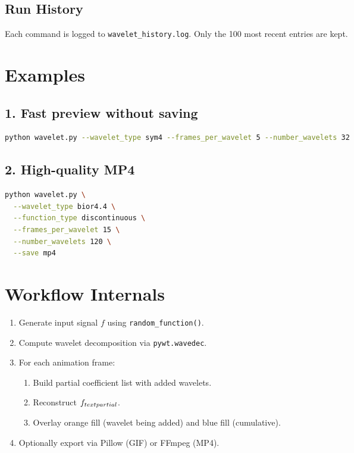 \documentclass[12pt]{article}
\begin{document}
\subsection*{Run History}
Each command is logged to \texttt{wavelet\_history.log}. Only the 100 most recent entries are kept.

\section{Examples}
\subsection*{1. Fast preview without saving}
\begin{lstlisting}[language=bash]
python wavelet.py --wavelet_type sym4 --frames_per_wavelet 5 --number_wavelets 32
\end{lstlisting}

\subsection*{2. High-quality MP4}
\begin{lstlisting}[language=bash]
python wavelet.py \
  --wavelet_type bior4.4 \
  --function_type discontinuous \
  --frames_per_wavelet 15 \
  --number_wavelets 120 \
  --save mp4
\end{lstlisting}

\section{Workflow Internals}
\begin{enumerate}[label=\arabic*.]
  \item Generate input signal $f$ using \texttt{random\_function()}.
  \item Compute wavelet decomposition via \texttt{pywt.wavedec}.
  \item For each animation frame:
    \begin{enumerate}[nosep]
      \item Build partial coefficient list with added wavelets.
      \item Reconstruct $f_{\\text{partial}}$.
      \item Overlay orange fill (wavelet being added) and blue fill (cumulative).
    \end{enumerate}
  \item Optionally export via Pillow (GIF) or FFmpeg (MP4).
\end{enumerate}
\end{document}
